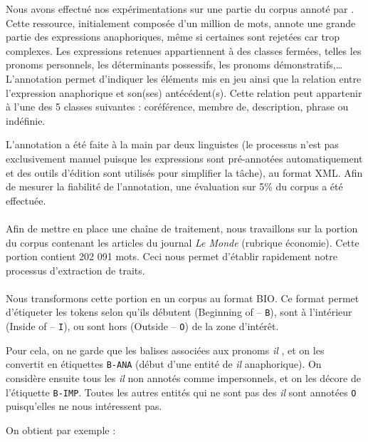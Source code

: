 \documentclass[a4paper,12pt]{article}
\begin{document}
Nous avons effectué nos expérimentations sur une partie du corpus annoté par \citet{tutin-hal-00373327}.
Cette ressource, initialement composée d'un million de mots, annote une grande partie des expressions anaphoriques, même si certaines sont rejetées car trop complexes. Les expressions retenues appartiennent à des classes fermées, telles les pronoms personnels, les déterminants possessifs, les pronoms démonstratifs,\ldots
L'annotation permet d'indiquer les éléments mis en jeu ainsi que la relation entre l'expression anaphorique et son(ses) antécédent(s). Cette relation peut appartenir à l'une des 5 classes suivantes : coréférence, membre de, description, phrase ou indéfinie.

L'annotation a été faite à la main par deux linguistes (le processus n'est pas exclusivement manuel puisque les expressions sont pré-annotées automatiquement et des outils d'édition sont utilisés pour simplifier la tâche), au format XML. Afin de mesurer la fiabilité de l'annotation, une évaluation sur 5\% du corpus a été effectuée.

\paragraph{}
Afin de mettre en place une chaîne de traitement, nous travaillons sur la portion du corpus contenant les articles du journal \emph{Le Monde} (rubrique économie). Cette portion contient 202 091 mots. Ceci nous permet d'établir rapidement notre processus d'extraction de traits.

\paragraph{}
Nous transformons cette portion en un corpus au format BIO. Ce format permet d'étiqueter les tokens selon qu'ils débutent (Beginning of -- \verb!B!), sont à l'intérieur (Inside of -- \verb!I!), ou sont hors (Outside -- \verb!O!) de la zone d'intérêt.

Pour cela, on ne garde que les balises associées aux pronoms \og \textit{il} \fg{}, et on les convertit en étiquettes \verb!B-ANA! (début d'une entité de \og \textit{il} \fg{} anaphorique). On considère ensuite tous les \og \textit{il} \fg{} non annotés comme impersonnels, et on les décore de l'étiquette \verb!B-IMP!. Toutes les autres entités qui ne sont pas des \og \textit{il} \fg{} sont annotées \verb!O! puisqu'elles ne nous intéressent pas.
\label{annotation-imp}

On obtient par exemple :
\end{document}
